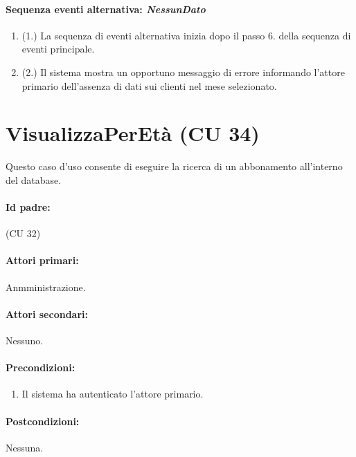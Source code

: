 \documentclass{article}
\begin{document}
		\paragraph{Sequenza eventi alternativa: \textit{NessunDato}}
	\begin{enumerate}	[leftmargin=28pt]
			\item  (1.) La sequenza di eventi alternativa inizia dopo il passo 6. della sequenza di eventi principale.
			\item  (2.) Il sistema mostra un opportuno messaggio di errore informando l'attore primario dell'assenza di dati sui clienti nel mese selezionato.
		\end{enumerate}
	
	




\newpage	
\section*{VisualizzaPerEtà (CU 34)}
	
	Questo caso d'uso consente di eseguire la ricerca di un abbonamento all'interno del database.
	
	\paragraph{Id padre:} (CU 32)
	
	\paragraph{Attori primari:}Anmministrazione.
	    
	\paragraph{Attori secondari:}Nessuno.
	
	\paragraph{Precondizioni:}
	\begin{enumerate}[itemsep=8pt,parsep=0pt]
		\item Il sistema ha autenticato l'attore primario.
	\end{enumerate}
	
	\paragraph{Postcondizioni:}Nessuna.
	
\end{document}
